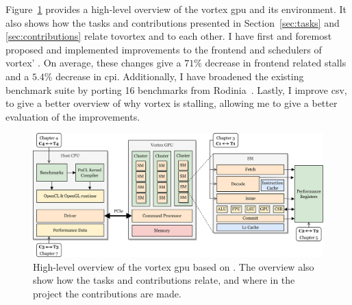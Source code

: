 Figure~\ref{fig:task-contribution} provides a high-level overview of the \Gls{vortex} \acrshort{gpu} and its environment. It also shows how the tasks and contributions presented in Section~\ref{sec:tasks} and \ref{sec:contributions} relate to\Gls{vortex} and to each other. I have first and foremost proposed and implemented improvements to the frontend and schedulers of \Gls{vortex}' . On average, these changes give a $71\%$ decrease in frontend related stalls and a $5.4\%$ decrease in \acrshort{cpi}. Additionally, I have broadened the existing benchmark suite by porting 16 benchmarks from Rodinia~\cite{rodinia, rodinia_characterization}. Lastly, I improve \acrshort{csv}, to give a better overview of why \Gls{vortex} is stalling, allowing me to give a better evaluation of the improvements.

\begin{figure}
    \centering
    \includegraphics[width=\textwidth]{figures/task-contribution-4.png}
    \caption[High-level overview of the \Gls{vortex} \acrshort{gpu}]{High-level overview of the \Gls{vortex} \acrshort{gpu} based on \cite{vortex}. The overview also show how the tasks and contributions relate, and where in the project the contributions are made.}
    \label{fig:task-contribution}
\end{figure}




